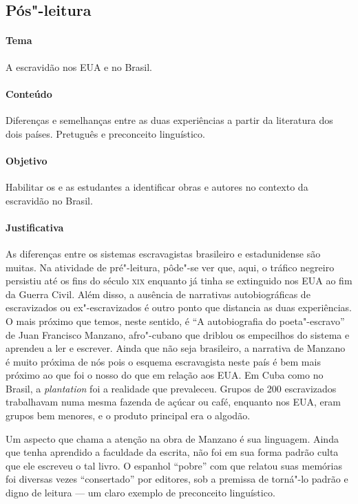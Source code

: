 \documentclass[11pt]{extarticle}
\begin{document}
\begin{enumerate}
\begin{enumerate}
\subsection{Pós"-leitura}


\paragraph{Tema} A escravidão nos EUA e no Brasil.

\paragraph{Conteúdo} Diferenças e semelhanças entre as duas experiências a partir da
literatura dos dois países. Pretuguês e preconceito linguístico.

\paragraph{Objetivo} Habilitar os e as estudantes a identificar obras e autores no contexto
da escravidão no Brasil. 

\paragraph{Justificativa} As diferenças entre os sistemas escravagistas brasileiro e estadunidense são
muitas. Na atividade de pré"-leitura, pôde"-se ver que, aqui, o tráfico negreiro persistiu até
os fins do século \textsc{xix} enquanto já tinha se extinguido nos EUA ao fim da Guerra Civil. 
Além disso, a ausência de narrativas autobiográficas de escravizados ou ex"-escravizados é outro
ponto que distancia as duas experiências. O mais próximo que temos, neste sentido, 
é ``A autobiografia do poeta"-escravo'' de Juan Francisco Manzano, afro"-cubano que driblou
os empecilhos do sistema e aprendeu a ler e escrever. Ainda que não seja brasileiro,
a narrativa de Manzano é muito próxima de nós pois o esquema escravagista neste país é bem
mais próximo ao que foi o nosso do que em relação aos EUA. Em Cuba como no Brasil, a 
\textit{plantation} foi a realidade que prevaleceu. Grupos de 200 escravizados trabalhavam numa
mesma fazenda de açúcar ou café, enquanto nos EUA, eram grupos bem menores, e o produto
principal era o algodão. 

Um aspecto que chama a atenção na obra de Manzano é sua linguagem. Ainda que tenha aprendido
a faculdade da escrita, não foi em sua forma padrão culta que ele escreveu o tal livro.
O espanhol ``pobre'' com que relatou suas memórias foi diversas vezes ``consertado'' por
editores, sob a premissa de torná"-lo padrão e digno de leitura --- um claro exemplo
de preconceito linguístico.


\end{enumerate}
\end{enumerate}
\end{document}
